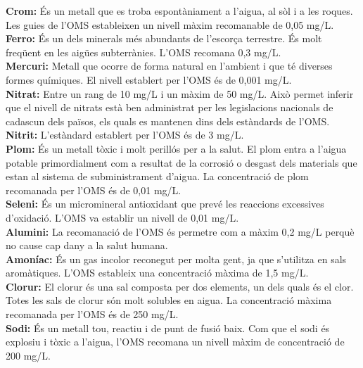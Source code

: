 \textbf{Crom:} És un metall que es troba espontàniament a l’aigua, al sòl i a les roques. Les guies de l’OMS estableixen un nivell màxim recomanable de 0,05 mg/L.\\

\textbf{Ferro:} És un dels minerals més abundants de l’escorça terrestre. És molt freqüent en les aigües subterrànies. L’OMS recomana 0,3 mg/L.\\

\textbf{Mercuri:} Metall que ocorre de forma natural en l’ambient i que té diverses formes químiques. El nivell establert per l’OMS és de 0,001 mg/L.\\

\textbf{Nitrat:} Entre un rang de 10 mg/L i un màxim de 50 mg/L. Això permet inferir que el nivell de nitrats està ben administrat per les legislacions nacionals de cadascun dels països, els quals es mantenen dins dels estàndards de l’OMS.\\

\textbf{Nitrit:} L’estàndard establert per l’OMS és de 3 mg/L.\\

\textbf{Plom:} És un metall tòxic i molt perillós per a la salut. El plom entra a l’aigua potable primordialment com a resultat de la corrosió o desgast dels materials que estan al sistema de subministrament d’aigua. La concentració de plom recomanada per l’OMS és de 0,01 mg/L.\\

\textbf{Seleni:} És un micromineral antioxidant que prevé les reaccions excessives d’oxidació. L’OMS va establir un nivell de 0,01 mg/L.\\

\textbf{Alumini:} La recomanació de l’OMS és permetre com a màxim 0,2 mg/L perquè no cause cap dany a la salut humana.\\

\textbf{Amoníac:} És un gas incolor reconegut per molta gent, ja que s’utilitza en sals aromàtiques. L’OMS estableix una concentració màxima de 1,5 mg/L.\\

\textbf{Clorur:} El clorur és una sal composta per dos elements, un dels quals és el clor. Totes les sals de clorur són molt solubles en aigua. La concentració màxima recomanada per l’OMS és de 250 mg/L.\\

\textbf{Sodi:} És un metall tou, reactiu i de punt de fusió baix. Com que el sodi és explosiu i tòxic a l’aigua, l’OMS recomana un nivell màxim de concentració de 200 mg/L.\\

